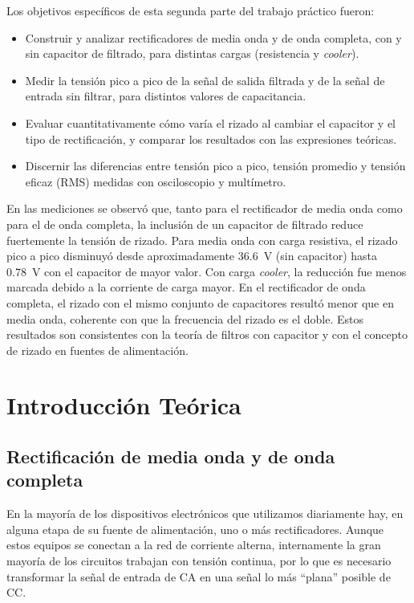 \documentclass[a4paper,12pt]{article}
\begin{document}
Los objetivos específicos de esta segunda parte del trabajo práctico fueron:
\begin{itemize}
    \item Construir y analizar rectificadores de media onda y de onda completa, con y sin capacitor de filtrado, para distintas cargas (resistencia y \emph{cooler}).
    \item Medir la tensión pico a pico de la señal de salida filtrada y de la señal de entrada sin filtrar, para distintos valores de capacitancia.
    \item Evaluar cuantitativamente cómo varía el rizado al cambiar el capacitor y el tipo de rectificación, y comparar los resultados con las expresiones teóricas.
    \item Discernir las diferencias entre tensión pico a pico, tensión promedio y tensión eficaz (RMS) medidas con osciloscopio y multímetro.
\end{itemize}

En las mediciones se observó que, tanto para el rectificador de media onda como para el de onda completa, la inclusión de un capacitor de filtrado reduce fuertemente la tensión de rizado. Para media onda con carga resistiva, el rizado pico a pico disminuyó desde aproximadamente \SI{36,6}{\volt} (sin capacitor) hasta \SI{0,78}{\volt} con el capacitor de mayor valor. Con carga \emph{cooler}, la reducción fue menos marcada debido a la corriente de carga mayor. En el rectificador de onda completa, el rizado con el mismo conjunto de capacitores resultó menor que en media onda, coherente con que la frecuencia del rizado es el doble. Estos resultados son consistentes con la teoría de filtros con capacitor y con el concepto de rizado en fuentes de alimentación.

\section{Introducción Teórica}

\subsection{Rectificación de media onda y de onda completa}

En la mayoría de los dispositivos electrónicos que utilizamos diariamente hay, en alguna etapa de su fuente de alimentación, uno o más rectificadores. Aunque estos equipos se conectan a la red de corriente alterna, internamente la gran mayoría de los circuitos trabajan con tensión continua, por lo que es necesario transformar la señal de entrada de CA en una señal lo más “plana” posible de CC.
\end{document}
